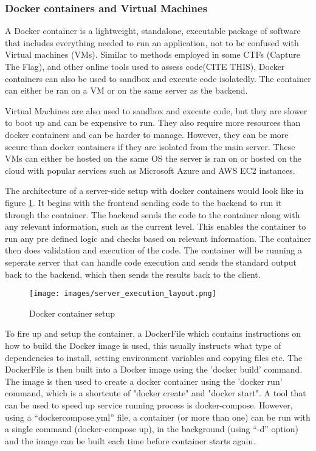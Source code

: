 \subsubsection{Docker containers and Virtual Machines}
A Docker container is a lightweight, standalone, executable package of software that includes everything needed to run an application, not to be confused with Virtual machines (VMs). Similar to methods employed in some CTFs (Capture The Flag), and other online tools used to assess code(CITE THIS), Docker containers can also be used to sandbox and execute code isolatedly. The container can either be ran on a VM or on the same server as the backend.

Virtual Machines are also used to sandbox and execute code, but they are slower to boot up and can be expensive to run. They also require more resources than docker containers and can be harder to manage. However, they can be more secure than docker containers if they are isolated from the main server. These VMs can either be hosted on the same OS the server is ran on or hosted on the cloud with popular services such as Microsoft Azure and AWS EC2 instances.

The architecture of a server-side setup with docker containers would look like in figure \ref{fig:docker container setup}. It begins with the frontend sending code to the backend to run it through the container. The backend sends the code to the container along with any relevant information, such as the current level. This enables the container to run any pre defined logic and checks based on relevant information. The container then does validation and execution of the code. The container will be running a seperate server that can handle code execution and sends the standard output back to the backend, which then sends the results back to the client. 

\begin{figure}
    \centering
    \texttt{[image: images/server\_execution\_layout.png]}
    \caption{Docker container setup}
    \label{fig:docker container setup}
\end{figure}

To fire up and setup the container, a DockerFile which contains instructions on how to build the Docker image is used, this usually instructs what type of dependencies to install, setting environment variables and copying files etc. The DockerFile is then built into a Docker image using the 'docker build' command. The image is then used to create a docker container using the 'docker run' command, which is a shortcute of "docker create" and "docker start". A tool that can be used to speed up service running process is docker-compose. However, using a “dockercompose.yml” file, a container (or more than one) can be run with a single command (docker-compose up), in the background (using “-d” option) and the image can be built each time before container starts again.

